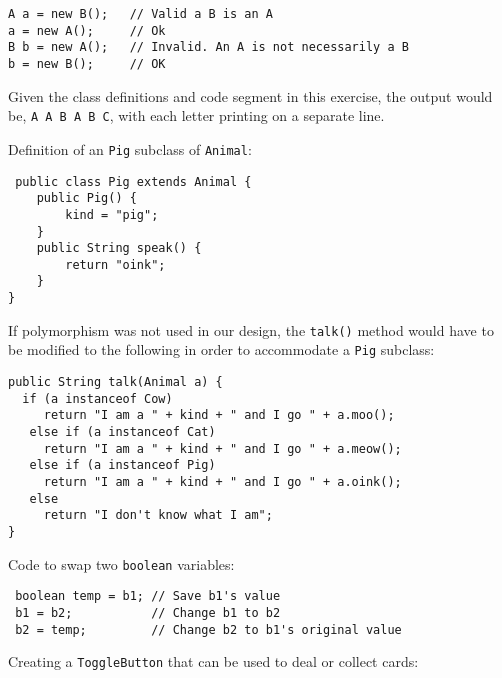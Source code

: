 \begin{ANS}
\begin{jjjlisting}
\begin{lstlisting}
A a = new B();   // Valid a B is an A
a = new A();     // Ok
B b = new A();   // Invalid. An A is not necessarily a B
b = new B();     // OK
\end{lstlisting}
\end{jjjlisting}

\item Given the class definitions and code segment in this exercise, the
output would be, {\tt A A B A B C}, with each letter printing on a separate
line.

\item Definition of an {\tt Pig} subclass of {\tt Animal}:

\begin{jjjlisting}
\begin{lstlisting}
 public class Pig extends Animal {
    public Pig() {
        kind = "pig";
    }
    public String speak() {
        return "oink";
    }
}
\end{lstlisting}
\end{jjjlisting}

\item If polymorphism was not used in our design, the {\tt talk()}
method would have to be modified to the following in order to accommodate
a {\tt Pig} subclass:

\begin{jjjlisting}
\begin{lstlisting}
public String talk(Animal a) {
  if (a instanceof Cow)
     return "I am a " + kind + " and I go " + a.moo();
   else if (a instanceof Cat)
     return "I am a " + kind + " and I go " + a.meow();
   else if (a instanceof Pig)
     return "I am a " + kind + " and I go " + a.oink();
   else
     return "I don't know what I am";
}
\end{lstlisting}
\end{jjjlisting}

\item Code to swap two {\tt boolean} variables:

\begin{jjjlisting}
\begin{lstlisting}
 boolean temp = b1; // Save b1's value
 b1 = b2;           // Change b1 to b2
 b2 = temp;         // Change b2 to b1's original value
\end{lstlisting}
\end{jjjlisting}

\item Creating a {\tt ToggleButton} that can be used to deal or
collect cards:


\end{ANS}
